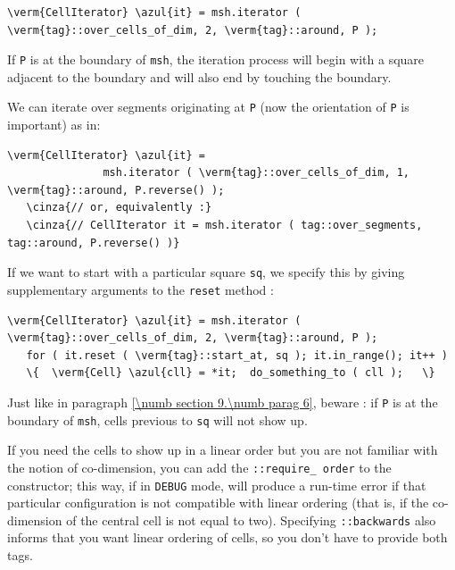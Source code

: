 \begin{Verbatim}[commandchars=\\\{\},formatcom=\small\tt,
   baselinestretch=0.94,framesep=2mm                      ]
   \verm{CellIterator} \azul{it} = msh.iterator ( \verm{tag}::over_cells_of_dim, 2, \verm{tag}::around, P );
\end{Verbatim}

If {\small\tt P} is at the boundary of {\small\tt msh}, the iteration process will begin
with a square adjacent to the boundary and will also end by touching the boundary.

We can iterate over segments originating at {\small\tt P} (now the orientation of
{\small\tt P} is important) as in:

\begin{Verbatim}[commandchars=\\\{\},formatcom=\small\tt,
   baselinestretch=0.94,framesep=2mm                      ]
   \verm{CellIterator} \azul{it} = 
               msh.iterator ( \verm{tag}::over_cells_of_dim, 1, \verm{tag}::around, P.reverse() );
   \cinza{// or, equivalently :}
   \cinza{// CellIterator it = msh.iterator ( tag::over_segments, tag::around, P.reverse() )}
\end{Verbatim}

If we want to start with a particular square {\small\tt sq}, we specify this by giving
supplementary arguments to the {\small\tt reset} method :

\begin{Verbatim}[commandchars=\\\{\},formatcom=\small\tt,
   baselinestretch=0.94,framesep=2mm                      ]
   \verm{CellIterator} \azul{it} = msh.iterator ( \verm{tag}::over_cells_of_dim, 2, \verm{tag}::around, P );
   for ( it.reset ( \verm{tag}::start_at, sq ); it.in_range(); it++ )
   \{  \verm{Cell} \azul{cll} = *it;  do_something_to ( cll );   \}
\end{Verbatim}

Just like in paragraph \ref{\numb section 9.\numb parag 6}, beware : if {\small\tt P}
is at the boundary of {\small\tt msh}, cells previous to {\small\tt sq} will not
show up.

If you need the cells to show up in a linear order but you are not familiar
with the notion of co-dimension, you can add the {\small\tt{}::require\_\,order}
to the {\small\tt{}} constructor;
this way, if in {\small\tt DEBUG} mode, {\maniFEM} will produce a run-time error
if that particular configuration is not compatible with linear ordering
(that is, if the co-dimension of the central cell is not equal to two).
Specifying {\small\tt{}::backwards} also informs {\maniFEM} that you want
linear ordering of cells, so you don't have to provide both tags.

